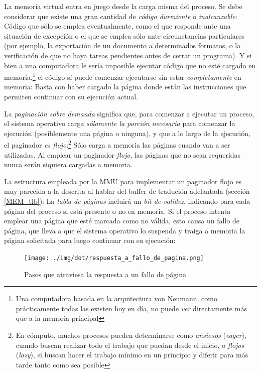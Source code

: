 \documentclass[11pt,fleqn]{book} %
\begin{document}
La memoria virtual entra en juego desde la carga misma del proceso.
Se debe considerar que existe una gran cantidad de \emph{código durmiente}
o \emph{inalcanzable}: Código
que sólo se emplea eventualmente, como el que responde ante una
situación de excepción o el que se emplea sólo ante circunstancias
particulares (por ejemplo, la exportación de un documento a
determinados formatos, o la verificación de que no haya tareas
pendientes antes de cerrar un programa). Y si bien a una computadora
le sería imposible ejecutar código que no esté cargado en
memoria,\footnote{Una computadora basada en la arquitectura von Neumann,
como prácticamente todas las existen hoy en día, no puede \emph{ver}
directamente más que a la memoria principal } el código sí puede
comenzar ejecutarse sin estar \emph{completamente} en memoria: Basta con
haber cargado la página donde están las instrucciones que permiten
continuar con su ejecución actual.

La \emph{paginación sobre demanda} significa que, para comenzar a ejecutar
un proceso, el sistema operativo carga \emph{sólamente la porción necesaria} para comenzar la ejecución (posiblemente una página o ninguna),
 y que a lo largo de la ejecución, el paginador \emph{es flojo}:\footnote{En
cómputo, muchos procesos pueden determinarse como \emph{ansiosos}
(\emph{eager}), cuando buscan realizar todo el trabajo que puedan desde el
inicio, o \emph{flojos} (\emph{lazy}), si buscan hacer el trabajo mínimo en un
principio y diferir para más tarde tanto como sea posible } Sólo carga
a memoria las páginas cuando van a ser utilizadas. Al emplear un
paginador \emph{flojo}, las páginas que no sean requeridas nunca serán
siquiera cargadas a memoria.

La estructura empleada por la MMU para implementar un paginador flojo
es muy parecida a la descrita al hablar del buffer de tradución
adelantada (sección \ref{MEM_tlb}): La \emph{tabla de páginas} incluirá un
\emph{bit de validez}, indicando para cada página del proceso si está
presente o no en memoria. Si el proceso intenta emplear una página que
esté marcada como no válida, esto causa un fallo de página, que lleva
a que el sistema operativo lo suspenda y traiga a memoria la página
solicitada para luego continuar con su ejecución:

\begin{figure}[htb]
\centering
\texttt{[image: ./img/dot/respuesta\_a\_fallo\_de\_pagina.png]}
\caption{\label{MEM_respuesta_a_fallo_de_pagina}Pasos que atraviesa la respuesta a un fallo de página}
\end{figure}
\end{document}
